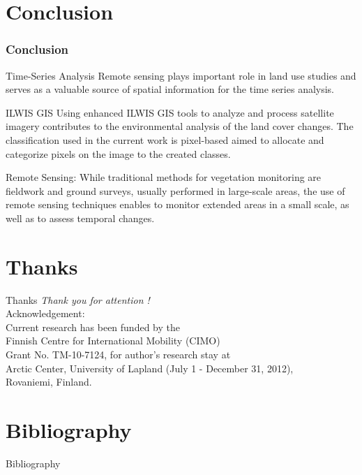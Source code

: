 \documentclass[pdflatex,compress,8pt,
	xcolor={dvipsnames,dvipsnames,svgnames,x11names,table},
	hyperref={colorlinks = true,breaklinks = true, urlcolor = NavyBlue, breaklinks = true}]{beamer}
\begin{document}
\section{Conclusion}
\begin{frame}\frametitle{Conclusion}

\begin{alertblock}{Time-Series Analysis}
Remote sensing plays important role in land use studies and serves as a valuable source of spatial information for the time series analysis.
\end{alertblock}

\begin{block}{ILWIS GIS}
Using enhanced ILWIS GIS tools to analyze and process satellite imagery contributes to the environmental analysis of the land cover changes. The classification used in the current work is pixel-based aimed to allocate and categorize pixels on the image to the created classes.
\end{block}

\begin{examples}{Remote Sensing:}
While traditional methods for vegetation monitoring are fieldwork and ground surveys, usually performed in large-scale areas, the use of remote sensing techniques enables to monitor extended areas in a small scale, as well as to assess temporal changes.
\end{examples}

\end{frame}

\section{Thanks}
\begin{frame}{Thanks}
  	\centering \LARGE 
  	\emph{Thank you for attention !}\\
	\vspace{5em}
\normalsize
Acknowledgement: \\
Current research has been funded by the \\
Finnish Centre for International Mobility (CIMO) \\
Grant No. TM-10-7124, for author's research stay at \\
Arctic Center, University of Lapland (July 1 - December 31, 2012),\\
Rovaniemi, Finland.
\end{frame}

\section{Bibliography}
\large{Bibliography}
\nocite{*}
\printbibliography

\end{document}
